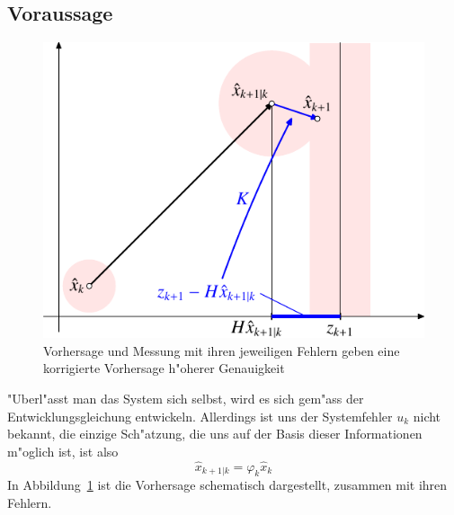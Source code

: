 \subsection{Voraussage}
\begin{figure}
\centering
\includegraphics{images/filter-2.pdf}
\caption{Vorhersage und Messung mit ihren jeweiligen Fehlern geben eine
korrigierte Vorhersage h"oherer Genauigkeit
\label{bild-vorhersage-korrektur}}
\end{figure}
"Uberl"asst man das System sich selbst, wird es sich gem"ass der
Entwicklungsgleichung entwickeln.
Allerdings ist uns der Systemfehler
$u_k$ nicht bekannt, die einzige Sch"atzung, die uns auf der Basis dieser
Informationen m"oglich ist, ist also
\[
\hat x_{k+1|k}=\varphi_k\hat x_k
\]
In Abbildung~\ref{bild-vorhersage-korrektur} ist die Vorhersage schematisch
dargestellt, zusammen mit ihren Fehlern.

